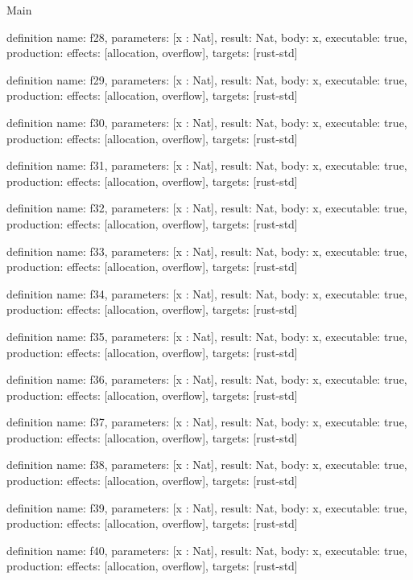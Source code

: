 \begin{lexlean}{Main}
\begin{semanticmodule}
definition{
  name: f28,
  parameters: [x : Nat],
  result: Nat,
  body: x,
  executable: true,
  production: {effects: [allocation, overflow], targets: [rust-std]}
}

definition{
  name: f29,
  parameters: [x : Nat],
  result: Nat,
  body: x,
  executable: true,
  production: {effects: [allocation, overflow], targets: [rust-std]}
}

definition{
  name: f30,
  parameters: [x : Nat],
  result: Nat,
  body: x,
  executable: true,
  production: {effects: [allocation, overflow], targets: [rust-std]}
}

definition{
  name: f31,
  parameters: [x : Nat],
  result: Nat,
  body: x,
  executable: true,
  production: {effects: [allocation, overflow], targets: [rust-std]}
}

definition{
  name: f32,
  parameters: [x : Nat],
  result: Nat,
  body: x,
  executable: true,
  production: {effects: [allocation, overflow], targets: [rust-std]}
}

definition{
  name: f33,
  parameters: [x : Nat],
  result: Nat,
  body: x,
  executable: true,
  production: {effects: [allocation, overflow], targets: [rust-std]}
}

definition{
  name: f34,
  parameters: [x : Nat],
  result: Nat,
  body: x,
  executable: true,
  production: {effects: [allocation, overflow], targets: [rust-std]}
}

definition{
  name: f35,
  parameters: [x : Nat],
  result: Nat,
  body: x,
  executable: true,
  production: {effects: [allocation, overflow], targets: [rust-std]}
}

definition{
  name: f36,
  parameters: [x : Nat],
  result: Nat,
  body: x,
  executable: true,
  production: {effects: [allocation, overflow], targets: [rust-std]}
}

definition{
  name: f37,
  parameters: [x : Nat],
  result: Nat,
  body: x,
  executable: true,
  production: {effects: [allocation, overflow], targets: [rust-std]}
}

definition{
  name: f38,
  parameters: [x : Nat],
  result: Nat,
  body: x,
  executable: true,
  production: {effects: [allocation, overflow], targets: [rust-std]}
}

definition{
  name: f39,
  parameters: [x : Nat],
  result: Nat,
  body: x,
  executable: true,
  production: {effects: [allocation, overflow], targets: [rust-std]}
}

definition{
  name: f40,
  parameters: [x : Nat],
  result: Nat,
  body: x,
  executable: true,
  production: {effects: [allocation, overflow], targets: [rust-std]}
}


\end{semanticmodule}
\end{lexlean}
